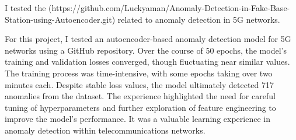 I tested the (https://github.com/Luckyaman/Anomaly-Detection-in-Fake-Base-Station-using-Autoencoder.git) related to anomaly detection in 5G networks.

For this project, I tested an autoencoder-based anomaly detection model for 5G networks using a GitHub repository. Over the course of 50 epochs, the model's training and validation losses converged, though fluctuating near similar values. The training process was time-intensive, with some epochs taking over two minutes each. Despite stable loss values, the model ultimately detected 717 anomalies from the dataset. The experience highlighted the need for careful tuning of hyperparameters and further exploration of feature engineering to improve the model’s performance. It was a valuable learning experience in anomaly detection within telecommunications networks.

